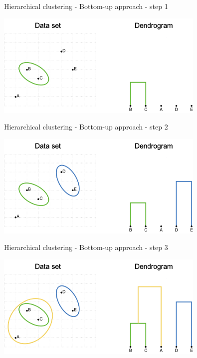 \documentclass[notes]{beamer}          %
\begin{document}
\begin{frame}{Hierarchical clustering - Bottom-up approach - step 1}
\begin{center}
\includegraphics[height=5cm]{../figures/week_6/HierarchicalClustering_2.png}  
\end{center}
\end{frame}

\begin{frame}{Hierarchical clustering - Bottom-up approach - step 2}
\begin{center}
\includegraphics[height=5cm]{../figures/week_6/HierarchicalClustering_3.png}  
\end{center}
\end{frame}

\begin{frame}{Hierarchical clustering - Bottom-up approach - step 3}
\begin{center}
\includegraphics[height=5cm]{../figures/week_6/HierarchicalClustering_4.png}  
\end{center}
\end{frame}
\end{document}
